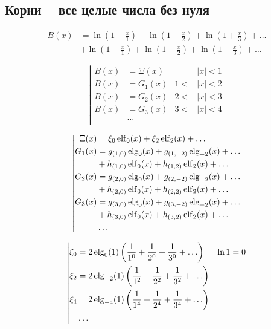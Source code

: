 
\subsection{Корни -- все целые числа без нуля}

\begin{equation*} \begin{aligned}
B(x) &=
  \ln{\left(1 + \frac{x}{1} \right)}
+ \ln{\left(1 + \frac{x}{2} \right)}
+ \ln{\left(1 + \frac{x}{3} \right)}
+ \ldots \\ &
+ \ln{\left(1 - \frac{x}{1} \right)}
+ \ln{\left(1 - \frac{x}{2} \right)}
+ \ln{\left(1 - \frac{x}{3} \right)}
+ \ldots
\end{aligned} \end{equation*}

\begin{equation*} \left| \begin{aligned}
B(x) &= \Xi(x) & 
&|x| < 1 \\
%
B(x) &= G_1(x) & 
1 < &|x| < 2 \\
%
B(x) &= G_2(x) & 
2 < &|x| < 3 \\
%
B(x) &= G_3(x) &
3 < &|x| < 4 \\
&\ldots & & \\
\end{aligned} \right. \end{equation*}

\begin{equation*} \left| \begin{aligned}
\Xi(x) &=
  \xi_0 \elf_0(x)
+ \xi_2 \elf_2(x) 
+ \ldots \\
%
G_1(x) &=
  g_{(1,0)} \elg_0(x) 
+ g_{(1,-2)} \elg_{-2}(x)
+ \ldots \\ &
+ h_{(1,0)} \elf_0(x)
+ h_{(1,2)} \elf_2(x)
+ \ldots \\
%
G_2(x) &=
  g_{(2,0)} \elg_0(x) 
+ g_{(2,-2)} \elg_{-2}(x)
+ \ldots \\ &
+ h_{(2,0)} \elf_0(x)
+ h_{(2,2)} \elf_2(x)
+ \ldots \\
%
G_3(x) &=
  g_{(3,0)} \elg_0(x) 
+ g_{(3,-2)} \elg_{-2}(x)
+ \ldots \\ &
+ h_{(3,0)} \elf_0(x)
+ h_{(3,2)} \elf_2(x)
+ \ldots \\
%
&\ldots \\
\end{aligned} \right. \end{equation*}

\begin{equation*} \left| \begin{aligned}
\xi_0 &= 2 \elg_0(1) \left(
  \frac{1}{1^0}
+ \frac{1}{2^0}
+ \frac{1}{3^0}
+ \ldots \right) & \ln{1} &= 0 \\
%
\xi_2 &= 2 \elg_{-2}(1) \left(
  \frac{1}{1^2}
+ \frac{1}{2^2}
+ \frac{1}{3^2}
+ \ldots \right) \\
%
\xi_4 &= 2 \elg_{-4}(1) \left(
  \frac{1}{1^4}
+ \frac{1}{2^4}
+ \frac{1}{3^4}
+ \ldots \right) \\
%
&\ldots \\
\end{aligned} \right. \end{equation*}

